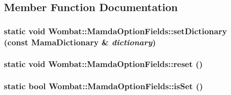 \subsection{Member Function Documentation}
\hypertarget{classWombat_1_1MamdaOptionFields_4b8a39f6b591cf20fd8b61f059fc5cb6}{
\subsubsection[setDictionary]{\setlength{\rightskip}{0pt plus 5cm}static void Wombat::Mamda\-Option\-Fields::set\-Dictionary (const Mama\-Dictionary \& {\em dictionary})}}
\label{classWombat_1_1MamdaOptionFields_4b8a39f6b591cf20fd8b61f059fc5cb6}


\hypertarget{classWombat_1_1MamdaOptionFields_a962211cff154a0b2219f6b630b7beb4}{
\subsubsection[reset]{\setlength{\rightskip}{0pt plus 5cm}static void Wombat::Mamda\-Option\-Fields::reset ()}}
\label{classWombat_1_1MamdaOptionFields_a962211cff154a0b2219f6b630b7beb4}


\hypertarget{classWombat_1_1MamdaOptionFields_55fa3901843c9eeac615b4caf20d9312}{
\subsubsection[isSet]{\setlength{\rightskip}{0pt plus 5cm}static bool Wombat::Mamda\-Option\-Fields::is\-Set ()}}
\label{classWombat_1_1MamdaOptionFields_55fa3901843c9eeac615b4caf20d9312}




